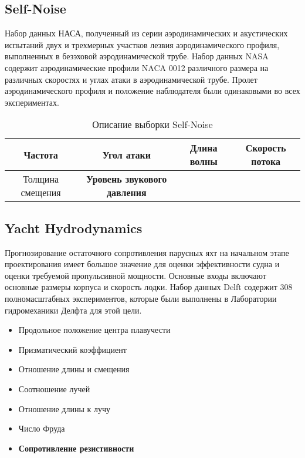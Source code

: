 \subsection{Self-Noise\cite{SelfNoise}}
Набор данных НАСА, полученный из серии аэродинамических и акустических испытаний двух и трехмерных участков лезвия аэродинамического профиля, выполненных в безэховой аэродинамической трубе. Набор данных NASA содержит аэродинамические профили NACA 0012 различного размера на различных скоростях и углах атаки в аэродинамической трубе. Пролет аэродинамического профиля и положение наблюдателя были одинаковыми во всех экспериментах.

\begin{table}[h]
\begin{center}
\caption{Описание выборки Self-Noise}
\begin{tabular}{|c|c|c|c|}
\hline
Частота &Угол атаки&Длина волны&Скорость потока\\
\hline
Толщина смещения&\bf Уровень звукового давления&&\\
\hline
\end{tabular}
\end{center}
\end{table}

\subsection{Yacht Hydrodynamics\cite{Yacht}}
Прогнозирование остаточного сопротивления парусных яхт на начальном этапе проектирования имеет большое значение для оценки эффективности судна и оценки требуемой пропульсивной мощности. Основные входы включают основные размеры корпуса и скорость лодки. Набор данных Delft содержит 308 полномасштабных экспериментов, которые были выполнены в Лаборатории гидромеханики Делфта для этой цели.

\begin{itemize}
\item Продольное положение центра плавучести
\item Призматический коэффициент
\item Отношение длины и смещения
\item Соотношение лучей
\item Отношение длины к лучу
\item Число Фруда
\item {\bf Сопротивление резистивности}
\end{itemize}